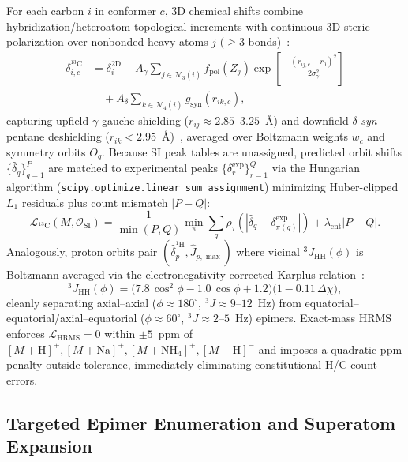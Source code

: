 \documentclass[10pt,twocolumn]{article}
\begin{document}
For each carbon $i$ in conformer $c$, 3D chemical shifts combine hybridization/heteroatom topological increments with continuous 3D steric polarization over nonbonded heavy atoms $j$ ($\ge 3$ bonds)~\cite{GrantCheney1967}:
\begin{equation}
\begin{aligned}
  \delta_{i,c}^{^{13}\text{C}} &= \delta_{i}^{\text{2D}} - A_\gamma \sum_{j \in \mathcal{N}_3(i)} f_{\text{pol}}(Z_j)\exp\!\left[-\frac{(r_{ij,c} - r_0)^2}{2\sigma_\gamma^2}\right] \\
  &\quad + A_\delta \sum_{k \in \mathcal{N}_4(i)} g_{\text{syn}}(r_{ik,c}),
\end{aligned}
\end{equation}
capturing upfield $\gamma$-gauche shielding ($r_{ij} \approx 2.85$--$3.25$~\AA) and downfield $\delta$-\emph{syn}-pentane deshielding ($r_{ik} < 2.95$~\AA)~\cite{Grover1974Cyclohexanols13C}, averaged over Boltzmann weights $w_c$ and symmetry orbits $O_q$. Because SI peak tables are unassigned, predicted orbit shifts $\{\hat{\delta}_q\}_{q=1}^P$ are matched to experimental peaks $\{\delta_r^{\text{exp}}\}_{r=1}^Q$ via the Hungarian algorithm (\texttt{scipy.optimize.linear\_sum\_assignment}) minimizing Huber-clipped $L_1$ residuals plus count mismatch $|P - Q|$:
\begin{equation}
  \mathcal{L}_{^{13}\text{C}}(M, \mathcal{O}_{\text{SI}}) = \frac{1}{\min(P,Q)} \min_{\pi} \sum_{q} \rho_\tau\!\left(|\hat{\delta}_q - \delta_{\pi(q)}^{\text{exp}}|\right) + \lambda_{\text{cnt}} |P - Q|.
\end{equation}
Analogously, proton orbits pair $(\hat{\delta}_p^{^1\text{H}}, \hat{J}_{p,\max})$ where vicinal $^3J_{\text{HH}}(\phi)$ is Boltzmann-averaged via the electronegativity-corrected Karplus relation~\cite{Karplus1963,Tsai2022MLJDP4}:
\begin{equation}
  {}^3J_{\text{HH}}(\phi) = \big(7.8\,\cos^2\phi - 1.0\,\cos\phi + 1.2\big)\big(1 - 0.11\,\Delta\chi\big),
\end{equation}
cleanly separating axial--axial ($\phi \approx 180^\circ$, $^3J \approx 9$--$12$~Hz) from equatorial--equatorial/axial--equatorial ($\phi \approx 60^\circ$, $^3J \approx 2$--$5$~Hz) epimers. Exact-mass HRMS enforces $\mathcal{L}_{\text{HRMS}} = 0$ within $\pm 5$~ppm of $[M+\text{H}]^+, [M+\text{Na}]^+, [M+\text{NH}_4]^+, [M-\text{H}]^-$ and imposes a quadratic ppm penalty outside tolerance, immediately eliminating constitutional H/C count errors.

\subsection{Targeted Epimer Enumeration and Superatom Expansion}
\label{sec:epimers}
\end{document}
